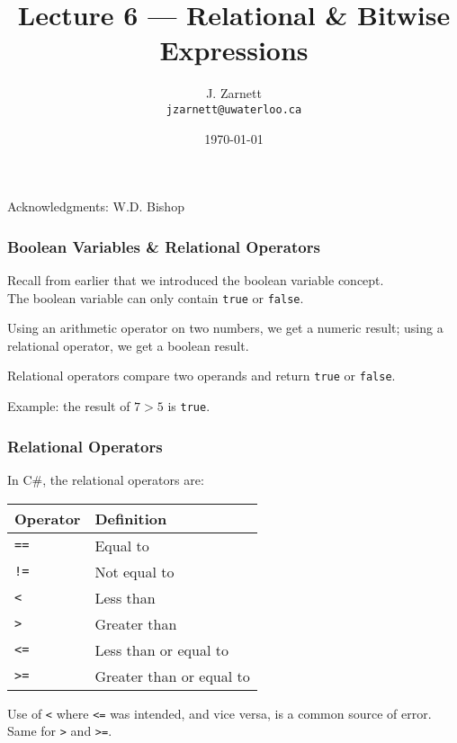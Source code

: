 

\title{Lecture 6 --- Relational \& Bitwise Expressions}

\author{J. Zarnett\\
\texttt{jzarnett@uwaterloo.ca}}
\date{\today}



\begin{frame}
  \titlepage
  
  \begin{center}
  \small{Acknowledgments: W.D. Bishop}
  \end{center}
 \end{frame}
 
\begin{frame}
\frametitle{Boolean Variables \& Relational Operators}
Recall from earlier that we introduced the boolean variable concept.\\
\quad The boolean variable can only contain \texttt{true} or \texttt{false}.

Using an arithmetic operator on two numbers, we get a numeric result; using a \alert{relational operator}, we get a boolean result.

Relational operators \alert{compare} two operands and return \texttt{true} or \texttt{false}.

Example: the result of $7 > 5$ is \texttt{true}.

\end{frame}

\begin{frame}
\frametitle{Relational Operators}

In C\#, the relational operators are:

\begin{center}
\begin{tabular}{l|l}
\textbf{Operator} & \textbf{Definition} \\ \hline
	\texttt{==} & Equal to\\ \hline
	\texttt{!=} & Not equal to\\ \hline
	\texttt{\textless} & Less than \\ \hline
	\texttt{\textgreater} & Greater than \\ \hline
	\texttt{\textless=} & Less than or equal to \\ \hline
	\texttt{\textgreater=} & Greater than or equal to\\ 
\end{tabular}
\end{center}

Use of \texttt{\textless} where \texttt{\textless=} was intended, and vice versa, is a common source of error. Same for \texttt{\textgreater} and \texttt{\textgreater=}.

\end{frame}

